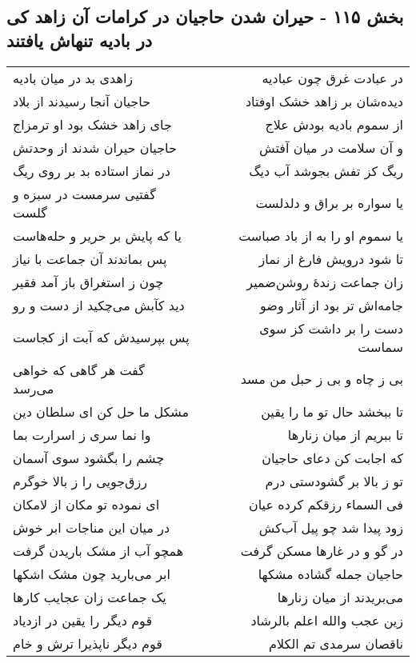 \begin{center}
\section*{بخش ۱۱۵ - حیران شدن حاجیان در کرامات آن زاهد  کی در بادیه تنهاش یافتند}
\label{sec:sh115}
\begin{longtable}{l p{0.5cm} r}
زاهدی بد در میان بادیه
&&
در عبادت غرق چون عبادیه
\\
حاجیان آنجا رسیدند از بلاد
&&
دیده‌شان بر زاهد خشک اوفتاد
\\
جای زاهد خشک بود او ترمزاج
&&
از سموم بادیه بودش علاج
\\
حاجیان حیران شدند از وحدتش
&&
و آن سلامت در میان آفتش
\\
در نماز استاده بد بر روی ریگ
&&
ریگ کز تفش بجوشد آب دیگ
\\
گفتیی سرمست در سبزه و گلست
&&
یا سواره بر براق و دلدلست
\\
یا که پایش بر حریر و حله‌هاست
&&
یا سموم او را به از باد صباست
\\
پس بماندند آن جماعت با نیاز
&&
تا شود درویش فارغ از نماز
\\
چون ز استغراق باز آمد فقیر
&&
زان جماعت زندهٔ روشن‌ضمیر
\\
دید کآبش می‌چکید از دست و رو
&&
جامه‌اش تر بود از آثار وضو
\\
پس بپرسیدش که آبت از کجاست
&&
دست را بر داشت کز سوی سماست
\\
گفت هر گاهی که خواهی می‌رسد
&&
بی ز چاه و بی ز حبل من مسد
\\
مشکل ما حل کن ای سلطان دین
&&
تا ببخشد حال تو ما را یقین
\\
وا نما سری ز اسرارت بما
&&
تا ببریم از میان زنارها
\\
چشم را بگشود سوی آسمان
&&
که اجابت کن دعای حاجیان
\\
رزق‌جویی را ز بالا خوگرم
&&
تو ز بالا بر گشودستی درم
\\
ای نموده تو مکان از لامکان
&&
فی السماء رزقکم کرده عیان
\\
در میان این مناجات ابر خوش
&&
زود پیدا شد چو پیل آب‌کش
\\
همچو آب از مشک باریدن گرفت
&&
در گو و در غارها مسکن گرفت
\\
ابر می‌بارید چون مشک اشکها
&&
حاجیان جمله گشاده مشکها
\\
یک جماعت زان عجایب کارها
&&
می‌بریدند از میان زنارها
\\
قوم دیگر را یقین در ازدیاد
&&
زین عجب والله اعلم بالرشاد
\\
قوم دیگر ناپذیرا ترش و خام
&&
ناقصان سرمدی تم الکلام
\\
\end{longtable}
\end{center}
